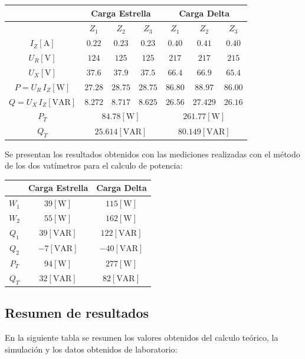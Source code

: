 \documentclass[letter,11pt]{article}
\begin{document}
\begin{center}
    \begin{tabular}{|c||c|c|c||c|c|c|}
    \hline
    & \multicolumn{3}{|c||}{\textbf{Carga Estrella}} &
    \multicolumn{3}{|c|}{\textbf{Carga Delta}}
    \tabularnewline \hline \hline
    & $Z_1$ & $Z_2$ & $Z_3$ & $Z_1$ & $Z_2$ & $Z_3$
    \tabularnewline \hline \hline
    $I_Z[\text{A}]$ & $0.22$ & $0.23$ & $0.23$ & $0.40$ & $0.41$ & $0.40$
    \tabularnewline \hline
    $U_R[\text{V}]$ & $124$ & $125$ & $125$ & $217$ & $217$ & $215$
    \tabularnewline \hline
    $U_X[\text{V}]$ & $37.6$ & $37.9$ & $37.5$ & $66.4$ & $66.9$ & $65.4$
    \tabularnewline \hline \hline
    $P=U_R\,I_Z[\text{W}]$ &
    $27.28$ & $28.75$ & $28.75$ & $86.80$ & $88.97$ & $86.00$
    \tabularnewline \hline
    $Q=U_X\,I_Z[\text{VAR}]$ &
    $8.272$ & $ 8.717$ & $ 8.625$ & $26.56$ & $27.429$ & $26.16$
    \tabularnewline \hline \hline
    $P_T$ &
    \multicolumn{3}{|c||}{$84.78[\text{W}]$} &
    \multicolumn{3}{|c|}{$261.77[\text{W}]$}
    \tabularnewline \hline
    $Q_T$ &
    \multicolumn{3}{|c||}{$25.614[\text{VAR}]$} &
    \multicolumn{3}{|c|}{$80.149[\text{VAR}]$}
    \tabularnewline \hline
    \end{tabular}
\end{center}

Se presentan los resultados obtenidos con las mediciones realizadas con el
método de los dos vatímetros para el calculo de potencia:

\begin{center}
    \begin{tabular}{|c||c|c|}
    \hline
    & \textbf{Carga Estrella} & \textbf{Carga Delta}
    \tabularnewline \hline \hline
    $W_1$ & $39[\text{W}]$ & $115[\text{W}]$
    \tabularnewline \hline
    $W_2$ & $55[\text{W}]$ & $162[\text{W}]$
    \tabularnewline \hline
    $Q_1$ & $39[\text{VAR}]$ & $122[\text{VAR}]$
    \tabularnewline \hline
    $Q_2$ & $-7[\text{VAR}]$ & $-40[\text{VAR}]$
    \tabularnewline \hline \hline
    $P_T$ & $94[\text{W}]$ & $277[\text{W}]$
    \tabularnewline \hline
    $Q_T$ & $32[\text{VAR}]$ & $82[\text{VAR}]$
    \tabularnewline \hline
    \end{tabular}
\end{center}

\subsection{Resumen de resultados}
En la siguiente tabla se resumen los valores obtenidos del calculo teórico,
la simulación y los datos obtenidos de laboratorio:
\end{document}
